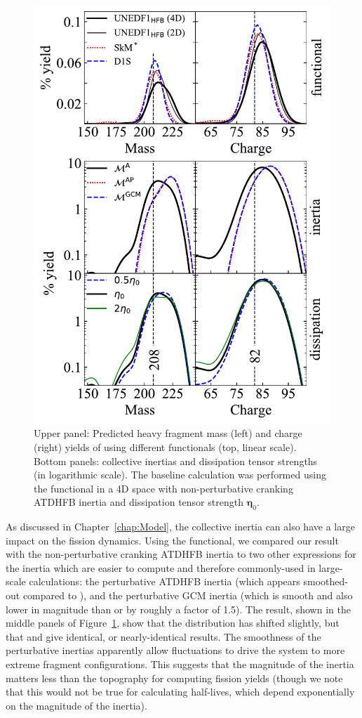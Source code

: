 \begin{figure}
	\centering
	\includegraphics[width=0.7\linewidth]{TeX_files/294Og_compare_all}
	\caption[$^{294}$Og heavy fragment masses and charges.]{Upper panel: Predicted heavy fragment mass (left) and charge (right) yields of \Og{} using different functionals (top, linear scale). Bottom panels: collective inertias and dissipation tensor strengths (in logarithmic scale). The baseline calculation was performed using the \hfb{} functional in a 4D space with non-perturbative cranking ATDHFB inertia and dissipation tensor strength $\mathbf{\eta}_0$.}
	\label{fig:294ogcompareall}
\end{figure}

As discussed in Chapter~\ref{chap:Model}, the collective inertia can also have a large impact on the fission dynamics. Using the {\hfb} functional, we compared our result with the non-perturbative cranking ATDHFB inertia {\MATDHF} to two other expressions for the inertia which are easier to compute and therefore commonly-used in large-scale calculations: the perturbative ATDHFB inertia {\MATDHFp} (which appears smoothed-out compared to {\MATDHF}), and the perturbative GCM inertia {\MGCMp} (which is smooth and also lower in magnitude than {\MATDHF} or {\MATDHFp} by roughly a factor of 1.5). The result, shown in the middle panels of Figure~\ref{fig:294ogcompareall}, show that the distribution has shifted slightly, but that {\MATDHFp} and {\MGCMp} give identical, or nearly-identical results. The smoothness of the perturbative inertias apparently allow fluctuations to drive the system to more extreme fragment configurations. This suggests that the magnitude of the inertia matters less than the topography for computing fission yields (though we note that this would not be true for calculating half-lives, which depend exponentially on the magnitude of the inertia).

